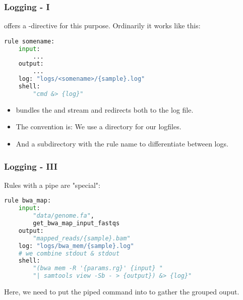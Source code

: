 \begin{frame}[fragile]
	\frametitle{Logging - I}
	\Snakemake{} offers a -directive for this purpose. Ordinarily it works like this:
	\begin{lstlisting}[language=Python,style=Python]
rule somename:
    input:
        ...
    output:
        ...
    log: "logs/<somename>/{sample}.log"
    shell:
        "cmd &> {log}"
	\end{lstlisting}
	\begin{docs}\footnotesize
		\begin{itemize}[<+->]
			\item \altverb{&} bundles the  and  stream and \altverb{>} redirects both to the log file.
			\item The convention is: We use a directory  for our logfiles.
			\item And a subdirectory with the rule name to differentiate between logs.
		\end{itemize} 
	\end{docs}
\end{frame}


\begin{frame}[fragile]
  \frametitle{Logging - III}
  Rules with a pipe are "special":  
  \begin{lstlisting}[language=Python,style=Python]
rule bwa_map:
    input:
        "data/genome.fa",
        get_bwa_map_input_fastqs
    output:
        "mapped_reads/{sample}.bam"
    log: "logs/bwa_mem/{sample}.log"
    # we combine stdout & stdout
    shell:
        "(bwa mem -R '{params.rg}' {input} "
        "| samtools view -Sb - > {output}) &> {log}"
   \end{lstlisting}
   \begin{docs}[Background]
     Here, we need to put the piped command into \altverb{()} to gather the grouped ouput. 
   \end{docs}
\end{frame}



